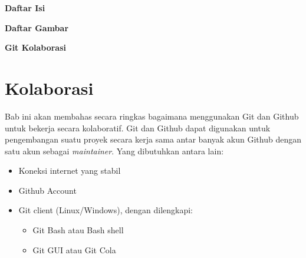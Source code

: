 \documentclass[12pt]{article}
\date{}
\begin{document}
	


	

\newpage

	\begin{center}
		\textbf{{\large Daftar Isi}}
	\end{center}
	
	\tableofcontents


\newpage

	\begin{center}
		\textbf{{\large Daftar Gambar}}
	\end{center}

	\listoffigures


\newpage

	\setcounter{page}{3}

	\setcounter{section}{0}
	
	\setcounter{figure}{0}
	
	\setcounter{subsubsection}{0}
	
	\begin{center}
		{\large \textbf{Git Kolaborasi}}
	\end{center}
	
	\section{Kolaborasi}
	
	Bab ini akan membahas secara ringkas bagaimana menggunakan Git dan Github untuk bekerja secara kolaboratif.
	Git dan Github dapat digunakan untuk pengembangan suatu proyek secara kerja sama antar banyak akun Github dengan satu akun sebagai \textit{maintainer}.
	Yang dibutuhkan antara lain:
	\begin{itemize}
		\item Koneksi internet yang stabil
		\item Github Account
		\item Git client (Linux/Windows), dengan dilengkapi:
		\begin{itemize}
			\item Git Bash atau Bash shell
			\item Git GUI atau Git Cola
		\end{itemize}
	\end{itemize}
\end{document}
